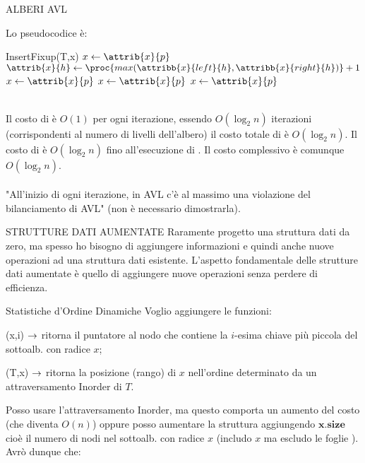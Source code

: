 \documentclass[8pt]{extarticle}
\begin{document}
\begin{formulario}
\begin{myParagraph}{ALBERI AVL}
\begin{descr}{1}
\begin{Descr}
			\end{Descr}
		\end{descr}
Lo pseudocodice è:
		\begin{code}{InsertFixup(T,x)}
\li $x\get\attrib{x}{p}$
\li {}
	\li $\attrib{x}{h}\get\proc{max(\attribb{x}{left}{h},\attribb{x}{right}{h})}+1$
	\li {}
		\li {}
			\li {}
		\END
		\li {}
		\li $x\get\attrib{x}{p}$
	\li {}
		\li {}
			\li {}
		\END
		\li {}
		\li $x\get\attrib{x}{p}$
	\END
	\li $x\get\attrib{x}{p}$
\END
		\end{code}
 \\
Il costo di  è $O(1)$ per ogni iterazione, essendo $O(\log_2 n)$ iterazioni (corrispondenti al numero di livelli dell'albero) il costo totale di  è $O(\log_2 n)$. Il costo di  è $O(\log_2 n)$ fino all'esecuzione di . Il costo complessivo è comunque $O(\log_2 n)$.\\
\\
"All'inizio di ogni iterazione, in AVL c'è al massimo una violazione del bilanciamento di AVL" (non è necessario dimostrarla).
	\end{myParagraph}
	\begin{myParagraph}{STRUTTURE DATI AUMENTATE}
Raramente progetto una struttura dati da zero, ma spesso ho bisogno di aggiungere informazioni e quindi anche nuove operazioni ad una struttura dati esistente. L'aspetto fondamentale delle strutture dati aumentate è quello di aggiungere nuove operazioni senza perdere di efficienza.
		\begin{subParagraph}{Statistiche d'Ordine Dinamiche}
Voglio aggiungere le funzioni:
			\begin{descr}{1}
				\item[\proc{\bo{OS-Select}}(x,i)] $\rightarrow$ ritorna il puntatore al nodo che contiene la $i$-esima chiave più piccola del sottoalb. con radice $x$;
				\item[\proc{\bo{OS-Rank}}(T,x)] $\rightarrow$ ritorna la posizione (rango) di $x$ nell'ordine determinato da un attraversamento Inorder di $T$.
			\end{descr}
Posso usare l'attraversamento Inorder, ma questo comporta un aumento del costo (che diventa $O(n)$) oppure posso aumentare la struttura aggiungendo $\bm{x.size}$ cioè il numero di nodi nel sottoalb. con radice $x$ (includo $x$ ma escludo le foglie ). Avrò dunque che:

\end{subParagraph}
\end{myParagraph}
\end{formulario}
\end{document}
